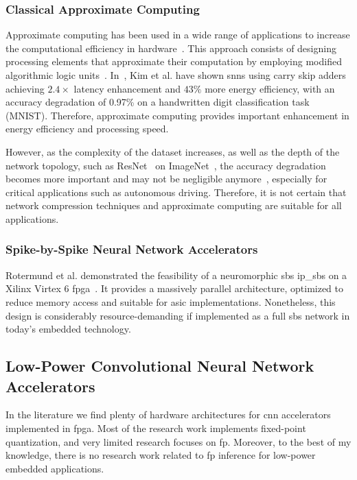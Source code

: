 \subsubsection{Classical Approximate Computing}
Approximate computing has been used in a wide range of applications to increase the computational efficiency in hardware~\cite{han2013approximate}. This approach consists of designing processing elements that approximate their computation by employing modified algorithmic logic units~\cite{han2013approximate}. In~\cite{kim2013energy}, Kim et al. have shown \glspl{snn} using carry skip adders achieving $2.4\times$ latency enhancement and $43\%$ more energy efficiency, with an accuracy degradation of 0.97\% on a handwritten digit classification task (MNIST). Therefore, approximate computing provides important enhancement in energy efficiency and processing speed.

However, as the complexity of the dataset increases, as well as the depth of the network topology, such as ResNet~\cite{he2016deep} on ImageNet~\cite{russakovsky2015imagenet}, the accuracy degradation becomes more important and may not be negligible anymore~\cite{rastegari2016xnor}, especially for critical applications such as autonomous driving. Therefore, it is not certain that network compression techniques and approximate computing are suitable for all applications.

\subsubsection{Spike-by-Spike Neural Network Accelerators}
Rotermund et al. demonstrated the feasibility of a neuromorphic \gls{sbs} \gls{ip_sbs} on a Xilinx Virtex 6 \gls{fpga}~\cite{rotermund2018massively}. It provides a massively parallel architecture, optimized to reduce memory access and suitable for \gls{asic} implementations. Nonetheless, this design is considerably resource-demanding if implemented as a full \gls{sbs} network in today's embedded technology.

\subsection{Low-Power Convolutional Neural Network Accelerators}
\label{sec:related_work}
In the literature we find plenty of hardware architectures for \gls{cnn} accelerators implemented in \gls{fpga}. Most of the research work implements fixed-point quantization, and very limited research focuses on \gls{fp}. Moreover, to the best of my knowledge, there is no research work related to \gls{fp} inference for low-power embedded applications.


